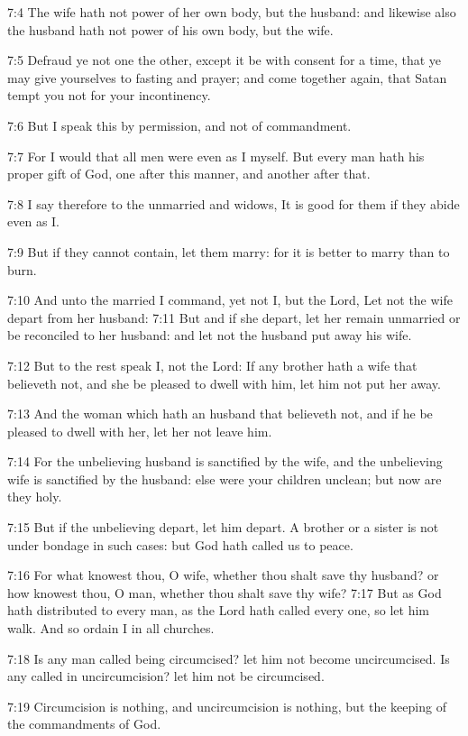 7:4 The wife hath not power of her own body, but the husband: and
likewise also the husband hath not power of his own body, but the
wife.

7:5 Defraud ye not one the other, except it be with consent for a
time, that ye may give yourselves to fasting and prayer; and come
together again, that Satan tempt you not for your incontinency.

7:6 But I speak this by permission, and not of commandment.

7:7 For I would that all men were even as I myself. But every man hath
his proper gift of God, one after this manner, and another after that.

7:8 I say therefore to the unmarried and widows, It is good for them
if they abide even as I.

7:9 But if they cannot contain, let them marry: for it is better to
marry than to burn.

7:10 And unto the married I command, yet not I, but the Lord, Let not
the wife depart from her husband: 7:11 But and if she depart, let her
remain unmarried or be reconciled to her husband: and let not the
husband put away his wife.

7:12 But to the rest speak I, not the Lord: If any brother hath a wife
that believeth not, and she be pleased to dwell with him, let him not
put her away.

7:13 And the woman which hath an husband that believeth not, and if he
be pleased to dwell with her, let her not leave him.

7:14 For the unbelieving husband is sanctified by the wife, and the
unbelieving wife is sanctified by the husband: else were your children
unclean; but now are they holy.

7:15 But if the unbelieving depart, let him depart. A brother or a
sister is not under bondage in such cases: but God hath called us to
peace.

7:16 For what knowest thou, O wife, whether thou shalt save thy
husband?  or how knowest thou, O man, whether thou shalt save thy
wife?  7:17 But as God hath distributed to every man, as the Lord hath
called every one, so let him walk. And so ordain I in all churches.

7:18 Is any man called being circumcised? let him not become
uncircumcised. Is any called in uncircumcision? let him not be
circumcised.

7:19 Circumcision is nothing, and uncircumcision is nothing, but the
keeping of the commandments of God.

